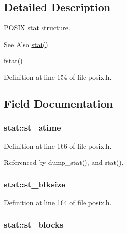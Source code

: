 \subsection{Detailed Description}
P\-O\-S\-I\-X stat structure. 

\begin{DoxySeeAlso}{See Also}
\hyperlink{posix_8c_a6cef290219b5c345e378932a8caa6217}{stat()} 

\hyperlink{posix_8h_a198a57e185e8a036ad06345623b84521}{fstat()} 
\end{DoxySeeAlso}


Definition at line 154 of file posix.\-h.



\subsection{Field Documentation}
\hypertarget{structstat_ab74d1e7e345e88b9d0fb2688a97cba64}{
\subsubsection[{st\-\_\-atime}]{ stat\-::st\-\_\-atime}}\label{structstat_ab74d1e7e345e88b9d0fb2688a97cba64}


Definition at line 166 of file posix.\-h.



Referenced by dump\-\_\-stat(), and stat().

\hypertarget{structstat_a38d474e1ae3cf6fbdde89ac3c3e308f1}{
\subsubsection[{st\-\_\-blksize}]{ stat\-::st\-\_\-blksize}}\label{structstat_a38d474e1ae3cf6fbdde89ac3c3e308f1}


Definition at line 164 of file posix.\-h.

\hypertarget{structstat_a42dd716b2f9234f961d949fc9500eefb}{
\subsubsection[{st\-\_\-blocks}]{ stat\-::st\-\_\-blocks}}\label{structstat_a42dd716b2f9234f961d949fc9500eefb}


